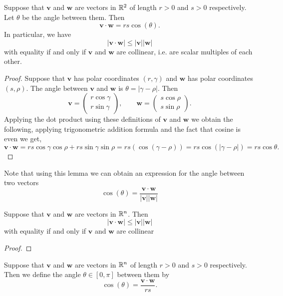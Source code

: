 \documentclass[10pt, a4paper]{article}
\newcommand{\mbf}[1]{\mathbf{#1}}
\begin{document}
\begin{lemma}
    Suppose that $\mbf{v}$ and $\mbf{w}$ are vectors in $\mathbb{R} ^ 2$ of length $r > 0 $ and $s > 0$ respectively. Let $\theta$ be the angle between them. Then
    \[
    \mbf{v \cdot w} = rs\cos(\theta).
    \]
    In particular, we have
    \[
    |\mbf{v \cdot w}| \leq |\mbf{v}||\mbf{w}|
    \]
    with equality if and only if $\mbf{v}$ and $\mbf{w}$ are collinear, i.e. are scalar multiples of each other.

    \begin{proof}
        Suppose that $\mbf{v}$ has polar coordinates $(r, \gamma)$ and $\mbf{w}$ has polar coordinates $(s, \rho)$. The angle between $\mbf{v}$ and $\mbf{w}$ is $\theta = |\gamma - \rho|$. Then
        \[
        \mbf{v} = \begin{pmatrix}
            r\cos\gamma \\
            r\sin\gamma
        \end{pmatrix},
        \qquad
        \mbf{w} = \begin{pmatrix}
            s\cos\rho \\
            s\sin\rho
        \end{pmatrix}.
        \]
        Applying the dot product using these definitions of $\mbf{v}$ and $\mbf{w}$ we obtain the following, applying trigonometric addition formula and the fact that cosine is even we get,
        \[
        \mbf{v \cdot w} =  rs\cos\gamma\cos\rho + rs\sin\gamma\sin\rho = rs(\cos(\gamma - \rho)) = rs\cos(|\gamma - \rho|) = rs\cos\theta.
        \]
    \end{proof}
\end{lemma}
Note that using this lemma we can obtain an expression for the angle between two vectors
\[
\cos(\theta) = \frac{\mbf{v \cdot w}}{|\mbf{v}||\mbf{w}|}
\]

\begin{theorem}
    Suppose that $\mbf{v}$ and $\mbf{w}$ are vectors in $\mathbb{R} ^ n$. Then
    \[
    |\mbf{v \cdot w}| \leq |\mbf{v}||\mbf{w}|
    \]
    with equality if and only if $\mbf{v}$ and $\mbf{w}$ are collinear

    \begin{proof}
        
    \end{proof}
\end{theorem}

\begin{definition}\label{def_linalg_vec_angbetvecs}
    Suppose that $\mbf{v}$ and $\mbf{w}$ are vectors in $\mathbb{R} ^ n$ of length $r > 0$ and $s > 0$ respectively. Then we define the angle $\theta \in [0, \pi]$ between them by
    \[
    \cos(\theta) = \frac{\mbf{v \cdot w}}{rs}.
    \]
\end{definition}
\end{document}
